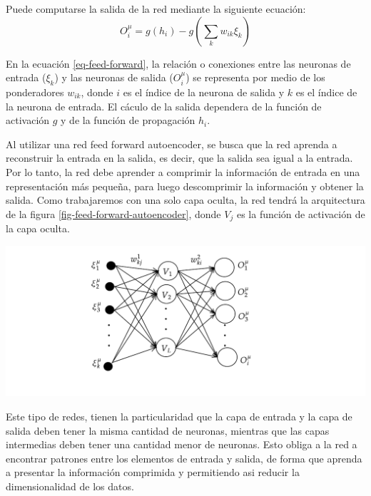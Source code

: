 \documentclass[aps,prl,reprint,groupedaddress]{revtex4-2}
\newenvironment{Figura}
  {\par\medskip\noindent\minipage{\linewidth}}
  {\endminipage\par\medskip}
\begin{document}
Puede computarse la salida de la red mediante la siguiente ecuación:
\begin{equation}
  O^{\mu}_{i} = g(h_{i}) - g \left( \sum_{k} w_{ik} \xi_{k} \right)
  \label{eq-feed-forward}
\end{equation}

En la ecuación \ref{eq-feed-forward}, la relación o conexiones entre las neuronas 
de entrada ($\xi_{k}$) y las neuronas de salida ($O^{\mu}_{i}$) se representa por 
medio de los ponderadores $w_{ik}$, donde $i$ es el índice de la neurona de salida 
y $k$ es el índice de la neurona de entrada. El cáculo de la salida dependera 
de la función de activación $g$ y de la función de propagación $h_{i}$.

Al utilizar una red feed forward autoencoder, se busca que la red aprenda a
reconstruir la entrada en la salida, es decir, que la salida sea igual a la entrada.
Por lo tanto, la red debe aprender a comprimir la información de entrada en una
representación más pequeña, para luego descomprimir la información y obtener la
salida. Como trabajaremos con una solo capa oculta, la red tendrá la
arquitectura de la figura \ref{fig-feed-forward-autoencoder}, donde $V_{j}$ 
es la función de activación de la capa oculta.

\begin{Figura}
  \centering
  \includegraphics[width=1\textwidth]{figs/red-autoencoder.pdf}
  \label{fig-feed-forward-autoencoder}
\end{Figura}

Este tipo de redes, tienen la particularidad que la capa de entrada y la capa 
de salida deben tener la misma cantidad de neuronas, mientras que las capas 
intermedias deben tener una cantidad menor de neuronas. Esto obliga a la red a 
encontrar patrones entre los elementos de entrada y salida, de forma que aprenda 
a presentar la información comprimida y permitiendo asi reducir la dimensionalidad 
de los datos. 
\end{document}
